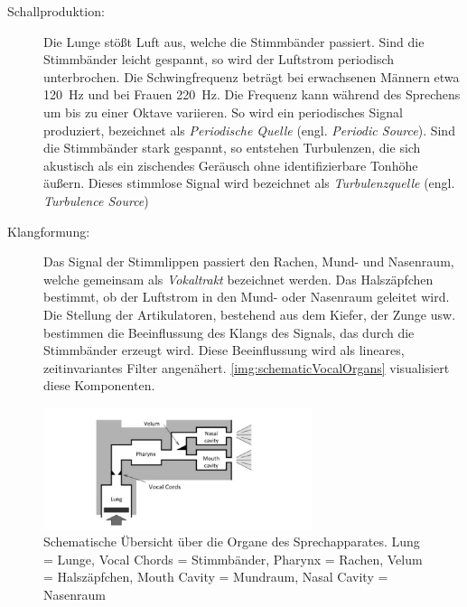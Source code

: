 \begin{description}

\item[Schallproduktion: ] Die Lunge stößt Luft aus, welche die Stimmbänder passiert. Sind die Stimmbänder leicht gespannt, so wird der Luftstrom periodisch unterbrochen. Die Schwingfrequenz beträgt bei erwachsenen Männern etwa \SI{120}{\hertz} und bei Frauen \SI{220}{\hertz}. Die Frequenz kann während des Sprechens um bis zu einer Oktave variieren. So wird ein periodisches Signal produziert, bezeichnet als \emph{Periodische Quelle} (engl. \emph{Periodic Source}). Sind die Stimmbänder stark gespannt, so entstehen Turbulenzen, die sich akustisch als ein zischendes Geräusch ohne identifizierbare Tonhöhe äußern. Dieses stimmlose Signal wird bezeichnet als \emph{Turbulenzquelle} (engl. \emph{Turbulence Source})
\item[Klangformung: ] Das Signal der Stimmlippen passiert den Rachen, Mund- und Nasenraum, welche gemeinsam als \emph {Vokaltrakt} bezeichnet werden. Das Halszäpfchen bestimmt, ob der Luftstrom in den Mund- oder Nasenraum geleitet wird. Die Stellung der Artikulatoren, bestehend aus dem Kiefer, der Zunge usw. bestimmen die Beeinflussung des Klangs des Signals, das durch die Stimmbänder erzeugt wird. Diese Beeinflussung wird als lineares, zeitinvariantes Filter angenähert.\cite[S. 62]{cryModel} \cite[S. 13]{sprachverarbeitung} \autoref{img:schematicVocalOrgans} visualisiert diese Komponenten.
\end{description}

\begin{figure}[h]
	\centering
	\includegraphics[width=0.7\textwidth]{bilder/SchematicVocalOrgans.png}
	\caption[Schematische Übersicht über die Organe des Sprechapparates]{Schematische Übersicht über die Organe des Sprechapparates. Lung = Lunge, Vocal Chords = Stimmbänder, Pharynx = Rachen, Velum = Halszäpfchen, Mouth Cavity = Mundraum, Nasal Cavity = Nasenraum \cite{speechProduction}}
	\label{img:schematicVocalOrgans}
\end{figure}	

